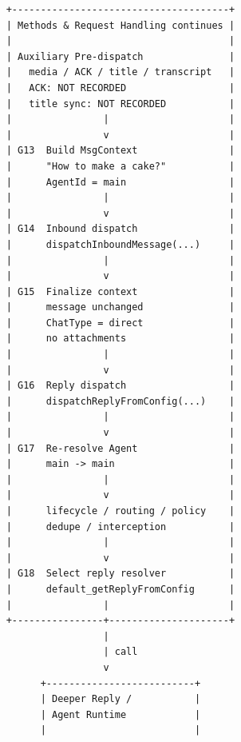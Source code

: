 \begin{figure}[p]
\begin{verbatim}
                 +--------------------------------------+
                 | Methods & Request Handling continues |
                 |                                      |
                 | Auxiliary Pre-dispatch               |
                 |   media / ACK / title / transcript   |
                 |   ACK: NOT RECORDED                  |
                 |   title sync: NOT RECORDED           |
                 |                |                     |
                 |                v                     |
                 | G13  Build MsgContext                |
                 |      "How to make a cake?"           |
                 |      AgentId = main                  |
                 |                |                     |
                 |                v                     |
                 | G14  Inbound dispatch                |
                 |      dispatchInboundMessage(...)     |
                 |                |                     |
                 |                v                     |
                 | G15  Finalize context                |
                 |      message unchanged               |
                 |      ChatType = direct               |
                 |      no attachments                  |
                 |                |                     |
                 |                v                     |
                 | G16  Reply dispatch                  |
                 |      dispatchReplyFromConfig(...)    |
                 |                |                     |
                 |                v                     |
                 | G17  Re-resolve Agent                |
                 |      main -> main                    |
                 |                |                     |
                 |                v                     |
                 |      lifecycle / routing / policy    |
                 |      dedupe / interception           |
                 |                |                     |
                 |                v                     |
                 | G18  Select reply resolver           |
                 |      default_getReplyFromConfig      |
                 |                |                     |
                 +----------------+---------------------+
                                  |
                                  | call
                                  v
                       +--------------------------+
                       | Deeper Reply /           |
                       | Agent Runtime            |
                       |                          |

\end{verbatim}
\end{figure}
